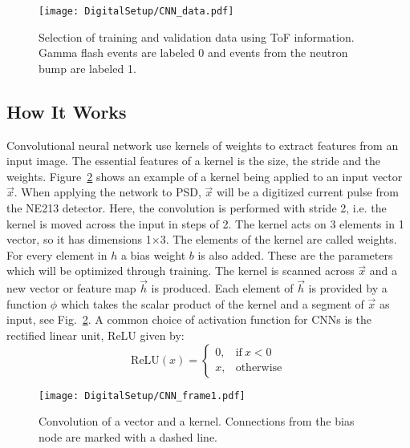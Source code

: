 \documentclass[main.tex]{subfiles}
\begin{document}
\begin{figure}[h!]
    \centering
        \texttt{[image: DigitalSetup/CNN\_data.pdf]}
        \caption[Selection of training and validation data]{Selection of training and validation data using ToF information. Gamma flash events are labeled 0 and events from the neutron bump are labeled 1.}
    \label{fig:CNN_data} 
\end{figure}

\subsection{How It Works}
Convolutional neural network use kernels of weights to extract features from an input image. The essential features of a kernel is the size, the stride and the weights. Figure~\ref{fig:CNN_frame1} shows an example of a kernel being applied to an input vector $\vec{x}$. When applying the network to PSD, $\vec{x}$ will be a digitized current pulse from the NE213 detector. Here, the convolution is performed with stride 2, i.e. the kernel is moved across the input in steps of 2. The kernel acts on 3 elements in 1 vector, so it has dimensions 1$\times$3. The elements of the kernel are called weights. For every element in $h$ a bias weight $b$ is also added. These are the parameters which will be optimized through training. The kernel is scanned across $\vec{x}$ and a new vector or feature map $\vec{h}$ is produced. Each element of $\vec{h}$ is provided by a function $\phi$ which takes the scalar product of the kernel and a segment of $\vec{x}$ as input, see Fig.~\ref{fig:CNN_frame1}. 
A common choice of activation function for CNNs is the rectified linear unit, ReLU given by:
\begin{equation}
	\textrm{ReLU}(x) = 
	\begin{cases}
    	0, & \text{if}\ x<0 \\
    	x, & \text{otherwise}
    \end{cases}
\end{equation}


\begin{figure}[h!]
    \centering
        \texttt{[image: DigitalSetup/CNN\_frame1.pdf]}
        \caption[Convolution of a vector and a kernel]{Convolution of a vector and a kernel. Connections from the bias node are marked with a dashed line.}
    \label{fig:CNN_frame1} 
\end{figure}
\end{document}

